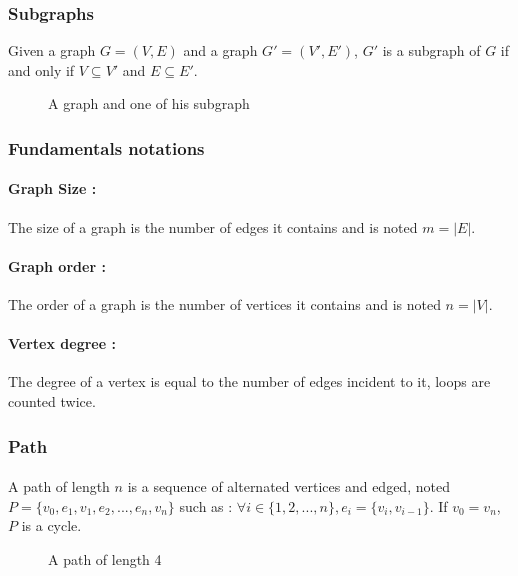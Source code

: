 \subsubsection{Subgraphs}
Given a graph $G = (V,E)$ and a graph $G' = (V',E')$, $G'$ is a subgraph of $G$ if and only if $V \subseteq V'$ and $E \subseteq E'$.

\begin{figure}[!h]
  \begin{center}
    
  \end{center}
  \caption{A graph and one of his subgraph}
\end{figure}


\subsubsection{Fundamentals notations}

\paragraph{Graph Size :}
The size of a graph is the number of edges it contains and is noted
$m = |E|$.

\paragraph{Graph order :}
The order of a graph is the number of vertices it contains and is noted
$n = |V|$.

\paragraph{Vertex degree :}
The degree of a vertex is equal to the number of edges incident to it, loops
are counted twice.

\subsubsection{Path}
\paragraph{}
A path of length $n$ is a sequence of alternated vertices and edged, noted
$P = \{v_0, e_1, v_1, e_2, ..., e_n, v_n\}$ such as :
$\forall i \in \{1,2, ..., n\}, e_i = \{v_i, v_{i-1}\}$. If $v_0 = v_n$, $P$ is
a cycle.

\begin{figure}[!h]
  \begin{center}
    
  \end{center}
  \caption{A path of length 4}
\end{figure}




